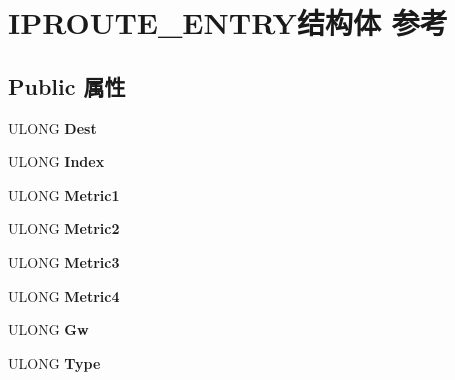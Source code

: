 \hypertarget{struct_i_p_r_o_u_t_e___e_n_t_r_y}{}\section{I\+P\+R\+O\+U\+T\+E\+\_\+\+E\+N\+T\+R\+Y结构体 参考}
\label{struct_i_p_r_o_u_t_e___e_n_t_r_y}
\subsection*{Public 属性}
\begin{DoxyCompactItemize}
\item 
\mbox{\label{struct_i_p_r_o_u_t_e___e_n_t_r_y_a0aa72443510f37be5a0d8036d7776ed3}} 
U\+L\+O\+NG {\bfseries Dest}
\item 
\mbox{\label{struct_i_p_r_o_u_t_e___e_n_t_r_y_a0c4050c49068b9feb948036588758920}} 
U\+L\+O\+NG {\bfseries Index}
\item 
\mbox{\label{struct_i_p_r_o_u_t_e___e_n_t_r_y_a3ff61ab57c8158f8f0c9eba599f4a6ad}} 
U\+L\+O\+NG {\bfseries Metric1}
\item 
\mbox{\label{struct_i_p_r_o_u_t_e___e_n_t_r_y_af9b5f64ac8b3250e643ca7929eb663ae}} 
U\+L\+O\+NG {\bfseries Metric2}
\item 
\mbox{\label{struct_i_p_r_o_u_t_e___e_n_t_r_y_ad1843eb016b98ec24adfdf78b6dd2097}} 
U\+L\+O\+NG {\bfseries Metric3}
\item 
\mbox{\label{struct_i_p_r_o_u_t_e___e_n_t_r_y_a2ddbc0b86ca8c7a204f4eaefbef29017}} 
U\+L\+O\+NG {\bfseries Metric4}
\item 
\mbox{\label{struct_i_p_r_o_u_t_e___e_n_t_r_y_a7d20d046e0ff818ad62c8f4a9c295fab}} 
U\+L\+O\+NG {\bfseries Gw}
\item 
\mbox{\label{struct_i_p_r_o_u_t_e___e_n_t_r_y_aaf37080b51dc62a667083826bd806900}} 
U\+L\+O\+NG {\bfseries Type}
\item 

\end{DoxyCompactItemize}
